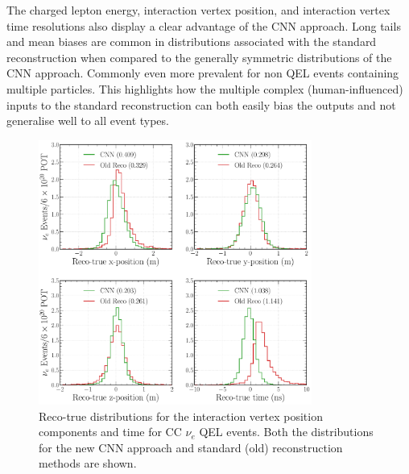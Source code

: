 The charged lepton energy, interaction vertex position, and interaction vertex time resolutions
also display a clear advantage of the CNN approach. Long tails and mean biases are common in
distributions associated with the standard reconstruction when compared to the generally symmetric
distributions of the CNN approach. Commonly even more prevalent for non QEL events containing
multiple particles. This highlights how the multiple complex (human-influenced) inputs to the
standard reconstruction can both easily bias the outputs and not generalise well to all event
types.

\begin{figure} %
    \includegraphics[width=0.8\textwidth]{diagrams/6-cvn/chipsnet/final_vertex_nuel_res_comparison.pdf}
    \caption[Reco-true distributions for the interaction vertex parameters for CC $\nu_{e}$ QEL
        events.] {Reco-true distributions for the interaction vertex position components and time
        for CC $\nu_{e}$ QEL events. Both the distributions for the new CNN approach and standard
        (old) reconstruction methods are shown.}
    \label{fig:final_vertex_nuel_res_comparison}
\end{figure}

